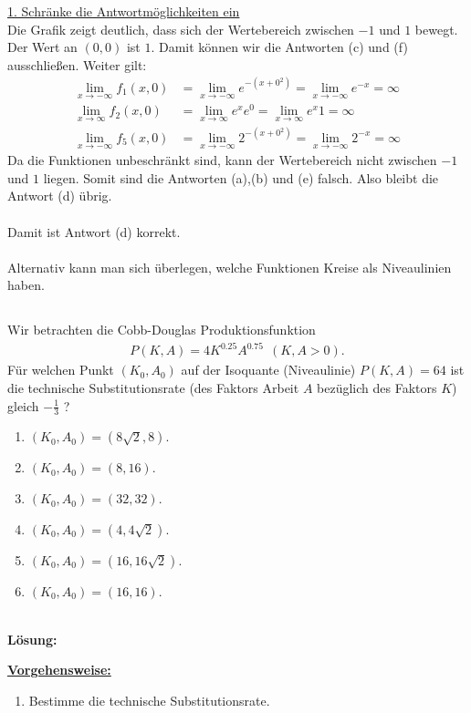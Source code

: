 \underline{1. Schränke die Antwortmöglichkeiten ein}\\
Die Grafik zeigt deutlich, dass sich der Wertebereich zwischen $ -1 $ und $ 1 $ bewegt. Der Wert an $ (0,0) $ ist $ 1 $.
Damit können wir die Antworten (c) und (f) ausschließen.
Weiter gilt:
\begin{align*}
	\lim \limits_{x \to -\infty}
	f_1(x,0) 
	&=
	\lim \limits_{x \to -\infty} e^{-(x +0^2)} 
	= 
	\lim \limits_{x \to -\infty} e^{-x} = \infty\\
	\lim \limits_{x \to \infty}
	f_2(x,0) 
	&=
	\lim \limits_{x \to \infty}
	e^x e^0 
	=
	\lim \limits_{x \to \infty}
	e^x 1 
	=
	\infty\\
		\lim \limits_{x \to -\infty}
	f_5(x,0) 
	&=
	\lim \limits_{x \to -\infty} 2^{-(x +0^2)} 
	= 
	\lim \limits_{x \to -\infty} 2^{-x} = \infty
\end{align*}
Da die Funktionen unbeschränkt sind, kann der Wertebereich nicht zwischen $ -1 $ und $ 1 $ liegen.
Somit sind die Antworten (a),(b) und (e) falsch. Also bleibt die Antwort (d) übrig.\\
\\
Damit ist Antwort (d) korrekt.
\\
\\
Alternativ kann man sich überlegen, welche Funktionen Kreise als Niveaulinien haben.


\newpage

\subsection*{}
Wir betrachten die Cobb-Douglas Produktionsfunktion
\begin{align*}
	P(K,A) 
	=
	4 K^{0.25} A^{0.75} \ \ (K,A > 0).
\end{align*}
Für welchen Punkt $ (K_0, A_0) $ auf der Isoquante (Niveaulinie) $ P(K,A) = 64 $ ist die technische Substitutionsrate (des Faktors Arbeit $ A $ bezüglich des Faktors $ K $) gleich $ - \frac{1}{3} $ ?
\renewcommand{\labelenumi}{(\alph{enumi})}
\begin{enumerate}
	\item 
	$ (K_0, A_0) = ( 8 \sqrt{2}, 8 ) $.
	\item
	$ (K_0, A_0) = ( 8 , 16 )$.
	\item
	$ (K_0, A_0) = ( 32 , 32)$.
	\item
	$ (K_0, A_0) = ( 4 , 4\sqrt{2})$.
	\item
	$ (K_0, A_0) = ( 16 , 16\sqrt{2})$.
	\item
	$ (K_0, A_0) = ( 16 , 16)$.
\end{enumerate}
\ \\
\textbf{Lösung:}
\begin{mdframed}
\underline{\textbf{Vorgehensweise:}}
\renewcommand{\labelenumi}{\theenumi.}
\begin{enumerate}
\item Bestimme die technische Substitutionsrate.
\end{enumerate}
\end{mdframed}

